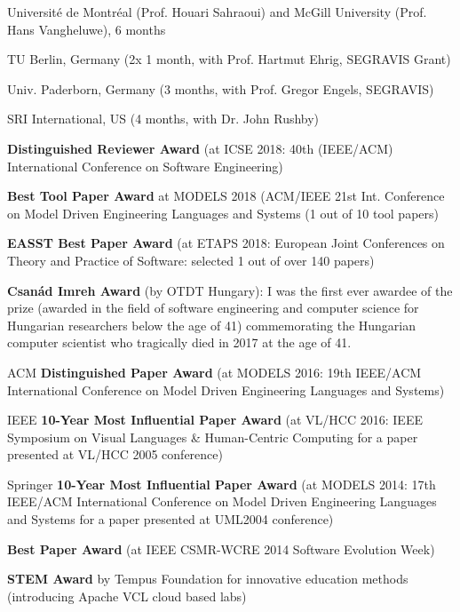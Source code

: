 \documentclass{xetexCV}
\begin{document}
Universit\'e de Montr\'eal  (Prof. Houari Sahraoui) and McGill University (Prof. Hans Vangheluwe),  6 months


TU Berlin, Germany (2x 1 month, with Prof. Hartmut Ehrig, SEGRAVIS Grant)

Univ. Paderborn, Germany  (3 months, with Prof. Gregor Engels,
SEGRAVIS) \

SRI International, US (4 months, with Dr. John Rushby)  


\textbf{Distinguished Reviewer Award}  (at ICSE 2018: 40th (IEEE/ACM) International Conference on Software Engineering)

\textbf{Best Tool Paper Award}  at MODELS 2018 (ACM/IEEE 21st Int. Conference on Model Driven Engineering Languages and Systems (1 out of 10 tool papers)

\textbf{EASST Best Paper Award}  (at ETAPS 2018: European Joint Conferences on Theory and Practice of Software: selected 1 out of over 140 papers)

\textbf{Csanád Imreh Award}  (by OTDT Hungary): I was the first ever awardee of the prize (awarded in the field of software engineering and computer science for Hungarian researchers below the age of 41) commemorating the Hungarian computer scientist who tragically died in 2017 at the age of 41.  

ACM  \textbf{Distinguished Paper Award} (at MODELS 2016: 19th IEEE/ACM International Conference on Model Driven Engineering Languages and Systems) 

IEEE  \textbf{10-Year Most Influential Paper Award} \newline (at VL/HCC 2016: IEEE Symposium on Visual Languages \& Human-Centric Computing for a paper presented at VL/HCC 2005 conference) 

Springer  \textbf{10-Year Most Influential Paper Award} \newline (at MODELS 2014: 17th IEEE/ACM International Conference on Model Driven Engineering Languages and Systems for a paper presented at UML2004 conference) 

\textbf{Best Paper Award}  (at IEEE CSMR-WCRE 2014 Software Evolution Week) 

\textbf{STEM Award}  by Tempus Foundation for innovative education methods (introducing Apache VCL cloud based labs)
\end{document}

